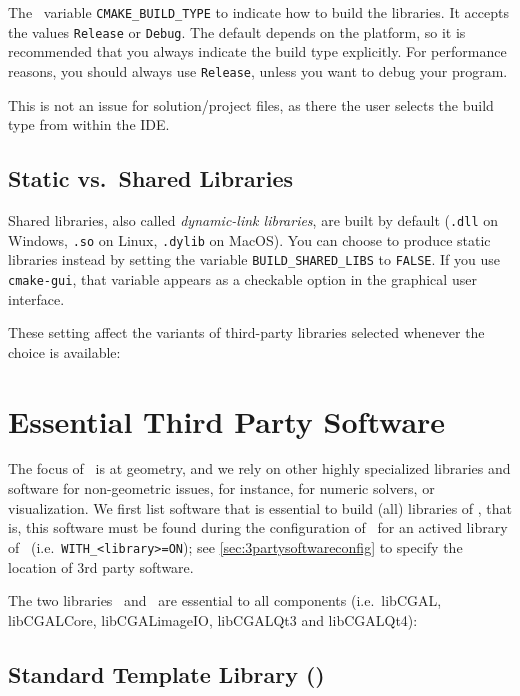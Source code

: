 The \cmake\ variable \texttt{CMAKE\_BUILD\_TYPE} to indicate how to build
the libraries. It accepts the values \texttt{Release} or
\texttt{Debug}. The default depends on the platform, so it is recommended
that you always indicate the build type explicitly. For performance
reasons, you should always use \texttt{Release}, unless you want to debug
your program.

This is not an issue for solution/project files, as there the user selects the build type from within the IDE.

\subsection{Static vs.\ Shared Libraries }

Shared libraries, also called \emph{dynamic-link libraries}, are built by default
(\texttt{.dll} on Windows, \texttt{.so} on Linux, \texttt{.dylib} on MacOS).  You
can choose to produce static libraries instead by setting the \cmake{}
variable \texttt{BUILD\_SHARED\_LIBS} to \texttt{FALSE}.  If you use
\texttt{cmake-gui}, that variable appears as a checkable option in the
graphical user interface.

These setting affect the variants of third-party libraries selected whenever the choice is available:

\section{Essential Third Party Software\label{sec:essential3rdpartysoftware}}

The focus of \cgal\ is at geometry, and we rely on other
highly specialized libraries and software for non-geometric issues,
for instance, for numeric solvers, or visualization. We first list software
that is essential to build (all) libraries of \cgal, that is, 
this software must be found during the configuration of \cgal\ for an
actived library of \cgal\ (i.e.~\texttt{WITH\_<library>=ON});
see \ref{sec:3partysoftwareconfig} to specify the location of 3rd
party software.

The two libraries \stl\ and \boost\ are essential to all components (i.e.~libCGAL,
libCGALCore,  libCGALimageIO, libCGALQt3 and libCGALQt4):

\subsection{Standard Template Library (\stl) \label{thirdparty:stl}}

